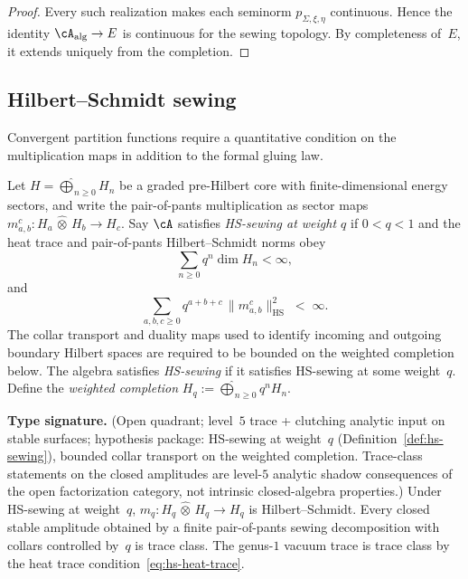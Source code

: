 \begin{proof}
Every such realization makes each seminorm $p_{\Sigma,\xi,\eta}$
continuous. Hence the identity
$\cA_{\mathrm{alg}} \to E$ is continuous for the sewing topology.
By completeness of~$E$, it extends uniquely from the completion.
\end{proof}

\subsection{Hilbert--Schmidt sewing}\label{subsec:hs-sewing}

Convergent partition functions require a quantitative condition on
the multiplication maps in addition to the formal gluing law.

\begin{definition}%
\label{def:hs-sewing}%
Let $H = \widehat{\bigoplus}_{n \geq 0} H_n$ be a graded pre-Hilbert
core with finite-dimensional energy sectors, and write the
pair-of-pants multiplication as sector maps
$m_{a,b}^c \colon H_a \,\widehat{\otimes}\, H_b \to H_c$.
Say $\cA$ satisfies \emph{HS-sewing at weight $q$} if
$0 < q < 1$ and the heat trace and pair-of-pants Hilbert--Schmidt
norms obey
\begin{equation}\label{eq:hs-heat-trace}
\sum_{n \geq 0} q^n \dim H_n < \infty,
\end{equation}
and
\begin{equation}\label{eq:hs-sewing}
\sum_{a,b,c \geq 0} q^{a+b+c}\,
\|m_{a,b}^c\|_{\mathrm{HS}}^2
\;<\; \infty.
\end{equation}
The collar transport and duality maps used to identify incoming and
outgoing boundary Hilbert spaces are required to be bounded on the
weighted completion below.  The algebra satisfies \emph{HS-sewing} if
it satisfies HS-sewing at some weight~$q$.
Define the \emph{weighted completion}
$H_q := \widehat{\bigoplus}_{n \geq 0} q^n H_n$.
\end{definition}

\begin{proposition}\label{prop:hs-trace-class}%
\textbf{Type signature.} (Open quadrant; level~$5$ trace + clutching
analytic input on stable surfaces; hypothesis package: HS-sewing at
weight~$q$ \textup{(}Definition~\ref{def:hs-sewing}\textup{)}, bounded
collar transport on the weighted completion. Trace-class statements
on the closed amplitudes are level-$5$ analytic shadow consequences
of the open factorization category, not intrinsic closed-algebra
properties.)
Under HS-sewing at weight~$q$,
$m_q \colon H_q \,\widehat{\otimes}\, H_q \to H_q$ is
Hilbert--Schmidt. Every closed stable amplitude obtained by a finite
pair-of-pants sewing decomposition with collars controlled by~$q$ is
trace class. The genus-$1$ vacuum trace is trace class by the heat
trace condition~\eqref{eq:hs-heat-trace}.
\end{proposition}

